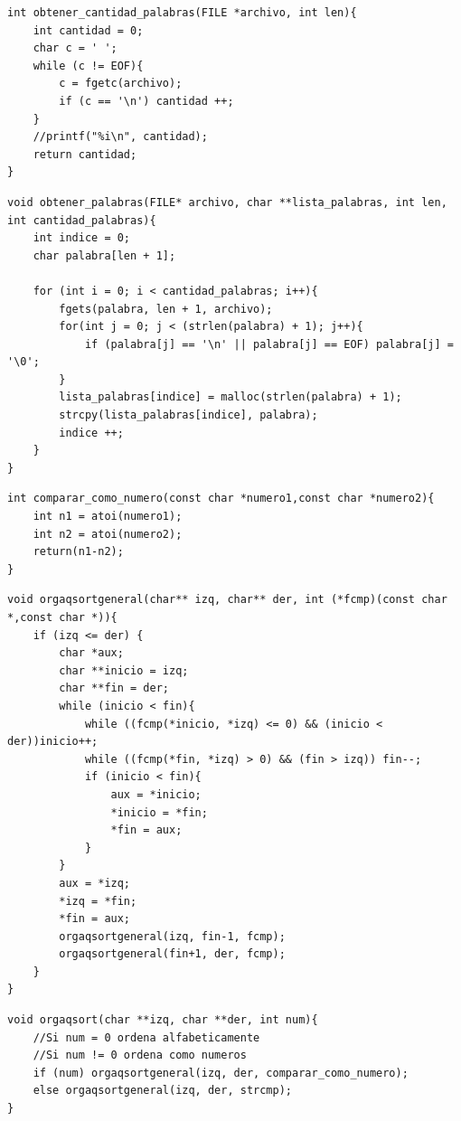 \documentclass[a4paper, 12pt]{article}
\begin{document}
	\begin{lstlisting}
int obtener_cantidad_palabras(FILE *archivo, int len){
    int cantidad = 0;
    char c = ' ';
    while (c != EOF){
        c = fgetc(archivo);
        if (c == '\n') cantidad ++;
    }
    //printf("%i\n", cantidad);
    return cantidad;
}
	\end{lstlisting}
	
	\begin{lstlisting}
void obtener_palabras(FILE* archivo, char **lista_palabras, int len, int cantidad_palabras){
    int indice = 0;
    char palabra[len + 1];

    for (int i = 0; i < cantidad_palabras; i++){
        fgets(palabra, len + 1, archivo);
        for(int j = 0; j < (strlen(palabra) + 1); j++){
            if (palabra[j] == '\n' || palabra[j] == EOF) palabra[j] = '\0';
        }
        lista_palabras[indice] = malloc(strlen(palabra) + 1);
        strcpy(lista_palabras[indice], palabra);
        indice ++;
    }
}
	\end{lstlisting}
	
	\begin{lstlisting}
int comparar_como_numero(const char *numero1,const char *numero2){
    int n1 = atoi(numero1);
    int n2 = atoi(numero2);
    return(n1-n2);
}
	\end{lstlisting}
	
	\begin{lstlisting}
void orgaqsortgeneral(char** izq, char** der, int (*fcmp)(const char *,const char *)){
    if (izq <= der) {
        char *aux;
        char **inicio = izq;
        char **fin = der;
        while (inicio < fin){
            while ((fcmp(*inicio, *izq) <= 0) && (inicio < der))inicio++;
            while ((fcmp(*fin, *izq) > 0) && (fin > izq)) fin--;
            if (inicio < fin){
                aux = *inicio;
                *inicio = *fin;
                *fin = aux;
            }
        }
        aux = *izq;
        *izq = *fin;
        *fin = aux;
        orgaqsortgeneral(izq, fin-1, fcmp);
        orgaqsortgeneral(fin+1, der, fcmp);
    }
}
	\end{lstlisting}
	
	\begin{lstlisting}
void orgaqsort(char **izq, char **der, int num){
    //Si num = 0 ordena alfabeticamente
    //Si num != 0 ordena como numeros
    if (num) orgaqsortgeneral(izq, der, comparar_como_numero);
    else orgaqsortgeneral(izq, der, strcmp);
}
	\end{lstlisting}
	
\end{document}
